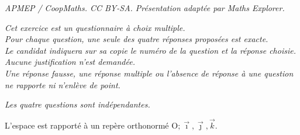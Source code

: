 \documentclass[10pt]{article}
\providecommand{\Oijk}{\(\mathrm{O};\vec{\imath},\vec{\jmath},\vec{k}\)}
\begin{document}
\noindent\textit{APMEP / CoopMaths. CC BY-SA. Présentation adaptée par Maths Explorer.}\par\medskip
\medskip

\emph{Cet exercice est un questionnaire à choix multiple.\\
Pour chaque question, une seule des quatre réponses proposées est exacte.\\
Le candidat indiquera sur sa copie le numéro de la question et la réponse choisie.\\
Aucune justification n'est demandée. \\
Une réponse fausse, une réponse multiple ou l'absence de réponse à une question ne rapporte ni n'enlève de point.}

\emph{Les quatre questions sont indépendantes.}

\medskip

L'espace est rapporté à un repère orthonormé \Oijk.

\medskip
\end{document}
